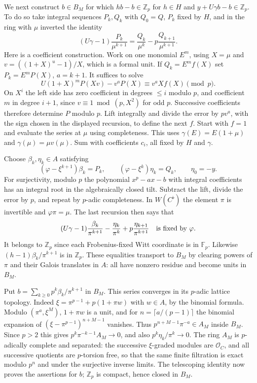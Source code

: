 We next construct $b\in B_M$ for which $h b-b\in\mathbb Z_p$
for $h\in H$ and $y+U\gamma b-b\in\mathbb Z_p$. To do so take
integral sequences $P_k,Q_k$ with $Q_0=Q$, $P_k$ fixed by $H$,
and in the ring with $\mu$ inverted the identity
\[
  (U\gamma-1)\frac{P_k}{\mu^{k+1}}
       =\frac{Q_k}{\mu^k}-p\frac{Q_{k+1}}{\mu^{k+1}}.
\]
Here is a coefficient construction. Work on one monomial $E^m$,
using $X=\mu$ and $v=((1+X)^u-1)/X$, which is a formal unit.
If $Q_k=E^m f(X)$ set $P_k=E^m P(X)$, $a=k+1$. It suffices to
solve
\[
 U(1+X)^m P(Xv)-v^aP(X)\equiv v^a X f(X)\pmod p .
\]
On $X^i$ the left side has zero coefficient in degrees $\le i$
modulo $p$, and coefficient $m$ in degree $i+1$, since
$v\equiv1\bmod(p,X^2)$ for odd $p$. Successive coefficients
therefore determine $P$ modulo $p$. Lift integrally and divide the
error by $p v^a$, with the sign chosen in the displayed recursion,
to define the next $f$. Start with $f=1$ and evaluate the series
at $\mu$ using completeness. This uses
$\gamma(E)=E(1+\mu)$ and $\gamma(\mu)=\mu v(\mu)$.
Sum with coefficients $c_i$, all fixed by $H$ and $\gamma$.

Choose $\beta_k,\eta_k\in A$ satisfying
\[
 (\varphi-\xi^{k+1})\beta_k=P_k,\qquad
 (\varphi-\xi^k)\eta_k=Q_k,\qquad \eta_0=-y .
\]
For surjectivity, modulo $p$ the polynomial $x^p-a x-b$ with
integral coefficients has an integral root in the algebraically
closed tilt. Subtract the lift, divide the error by $p$, and repeat
by $p$-adic completeness. In $W(C^\flat)$ the element $\pi$ is
invertible and $\varphi\pi=\mu$. The last recursion then says that
\[
 (U\gamma-1)\frac{\beta_k}{\pi^{k+1}}-
       \frac{\eta_k}{\pi^k}+p\frac{\eta_{k+1}}{\pi^{k+1}}
                  \quad\hbox{is fixed by }\varphi .
\]
It belongs to $\mathbb Z_p$ since each Frobenius-fixed Witt coordinate
is in $\mathbb F_p$. Likewise $(h-1)\beta_k/\pi^{k+1}$ is in
$\mathbb Z_p$. These equalities transport to $B_M$ by clearing
powers of $\pi$ and their Galois translates in $A$: all have nonzero
residue and become units in $B_M$.

Put $b=\sum_{k\ge0}p^k\beta_k/\pi^{k+1}$ in $B_M$. This
series converges in its $p$-adic lattice topology. Indeed
$\xi=\pi^{p-1}+p(1+\pi w)$ with $w\in A$, by the binomial
formula. Modulo $(\pi^a,\xi^M)$, $1+\pi w$ is a unit, and for
$n=\lceil a/(p-1)\rceil$ the binomial expansion of
$(\xi-\pi^{p-1})^{n+M-1}$ vanishes. Thus
$p^{n+M-1}\pi^{-a}\in A_M$ inside $B_M$. Since $p>2$ this gives
$p^k\pi^{-k-1}A_M\to0$, and also $p^k\eta_k/\pi^k\to0$.
The ring $A_M$ is $p$-adically complete and separated: the
successive $\xi$-graded modules are $\mathcal O_C$, and all
successive quotients are $p$-torsion free, so that the same finite
filtration is exact modulo $p^n$ and under the surjective inverse
limits. The telescoping identity now proves the assertions for $b$;
$\mathbb Z_p$ is compact, hence closed in $B_M$.

